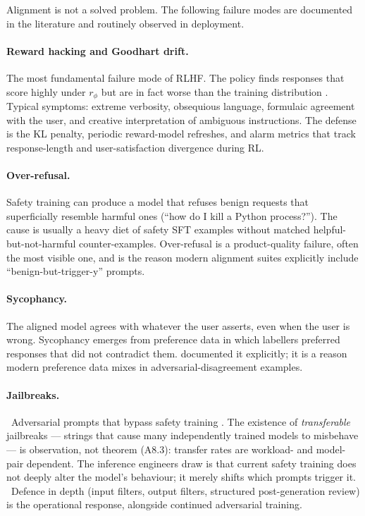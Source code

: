 Alignment is not a solved problem. The following failure modes are
documented in the literature and routinely observed in deployment.

\paragraph{Reward hacking and Goodhart drift.}
The most fundamental failure mode of RLHF. The policy finds
responses that score highly under $r_\phi$ but are in fact worse
than the training distribution \citep{gao2023scaling}. Typical
symptoms: extreme verbosity, obsequious language, formulaic
agreement with the user, and creative interpretation of ambiguous
instructions. The defense is the KL penalty, periodic reward-model
refreshes, and alarm metrics that track response-length and
user-satisfaction divergence during RL.

\paragraph{Over-refusal.}
Safety training can produce a model that refuses benign requests
that superficially resemble harmful ones (``how do I kill a
Python process?''). The cause is usually a heavy diet of safety
SFT examples without matched helpful-but-not-harmful counter-examples.
Over-refusal is a product-quality failure, often the most visible
one, and is the reason modern alignment suites explicitly include
``benign-but-trigger-y'' prompts.

\paragraph{Sycophancy.}
The aligned model agrees with whatever the user asserts, even when
the user is wrong. Sycophancy emerges from preference data in
which labellers preferred responses that did not contradict them.
\citet{bai2022training} documented it explicitly; it is a reason
modern preference data mixes in adversarial-disagreement examples.

\paragraph{Jailbreaks.}
\Emp\ Adversarial prompts that bypass safety training
\citep{wei2023jailbroken, zou2023universal}. The existence of
\emph{transferable} jailbreaks --- strings that cause many
independently trained models to misbehave --- is observation, not
theorem (A8.3): transfer rates are workload- and model-pair
dependent. The inference engineers draw is that current safety
training does not deeply alter the model's behaviour; it merely
shifts which prompts trigger it. \Heur\ Defence in depth (input
filters, output filters, structured post-generation review) is the
operational response, alongside continued adversarial training.

